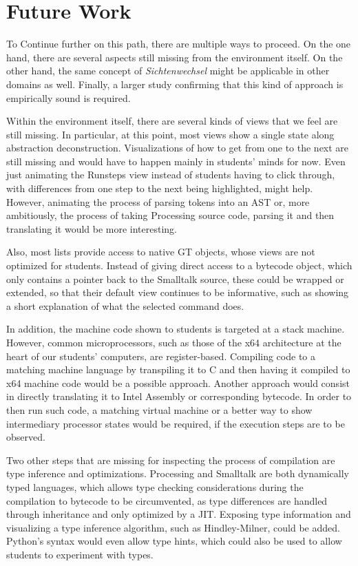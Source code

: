 \section{Future Work} \label{sc_future}

To Continue further on this path, there are multiple ways to proceed. On the one hand, there are several aspects still missing from the environment itself. On the other hand, the same concept of \emph{Sichtenwechsel} might be applicable in other domains as well. Finally, a larger study confirming that this kind of approach is empirically sound is required.

Within the environment itself, there are several kinds of views that we feel are still missing. In particular, at this point, most views show a single state along abstraction deconstruction. Visualizations of how to get from one to the next are still missing and would have to happen mainly in students' minds for now. Even just animating the Runsteps view instead of students having to click through, with differences from one step to the next being highlighted, might help. However, animating the process of parsing tokens into an \ac{AST} or, more ambitiously, the process of taking Processing source code, parsing it and then translating it would be more interesting.

Also, most lists provide access to native \ac{GT} objects, whose views are not optimized for students. Instead of \eg giving direct access to a bytecode object, which only contains a pointer back to the Smalltalk source, these could be wrapped or extended, so that their default view continues to be informative, such as showing a short explanation of what the selected command does.

In addition, the machine code shown to students is targeted at a stack machine. However, common microprocessors, such as those of the x64 architecture at the heart of our students' computers, are register-based. Compiling code to a matching machine language by \eg transpiling it to C and then having it compiled to x64 machine code would be a possible approach. Another approach would consist in directly translating it to Intel Assembly or corresponding bytecode. In order to then run such code, a matching virtual machine or a better way to show intermediary processor states would be required, if the execution steps are to be observed.

Two other steps that are missing for inspecting the process of compilation are type inference and optimizations. Processing and Smalltalk are both dynamically typed languages, which allows type checking considerations during the compilation to bytecode to be circumvented, as type differences are handled through inheritance and only optimized by a \ac{JIT}. Exposing type information and visualizing a type inference algorithm, such as Hindley-Milner, could be added. Python's syntax would even allow type hints, which could also be used to allow students to experiment with types.

